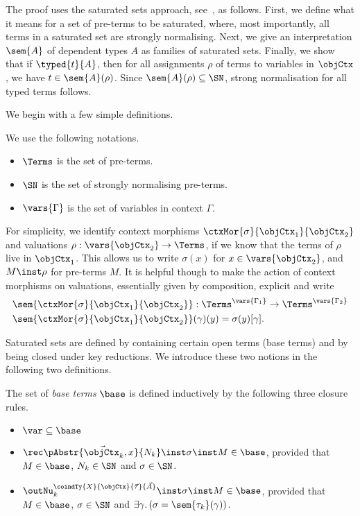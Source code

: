 \documentclass[preprint]{sigplanconf}
\begin{document}
The proof uses the saturated sets approach, see~\cite{Geuvers:SN-CoC-SAT}, as
follows.
First, we define what it means for a set of pre-terms to be saturated, where,
most importantly, all terms in a saturated set are strongly normalising.
Next, we give an interpretation $\sem{A}$ of dependent types $A$ as families of
saturated sets.
Finally, we show that if $\typed{t}{A}$, then for all assignments $\rho$ of
terms to variables in $\objCtx$, we have $t \in \sem{A}(\rho)$.
Since $\sem{A}(\rho) \subseteq \SN$, strong normalisation for all typed terms
follows.

We begin with a few simple definitions.
\begin{definition}
  We use the following notations.
  \begin{itemize}
  \item $\Terms$ is the set of pre-terms.
  \item $\SN$ is the set of strongly normalising pre-terms.
  \item $\vars{\Gamma}$ is the set of variables in context $\Gamma$.
  \end{itemize}
\end{definition}

For simplicity, we identify context morphisms
$\ctxMor{\sigma}{\objCtx_1}{\objCtx_2}$ and valuations
$\rho : \vars{\objCtx_2} \to \Terms$, if we know that the terms of $\rho$ live
in $\objCtx_1$.
This allows us to write $\sigma(x)$ for $x \in \vars{\objCtx_2}$, and
$M \inst \rho$ for pre-terms $M$.
It is helpful though to make the action of context morphisms on
valuations, essentially given by composition, explicit and write
\begin{equation}
  \label{eq:sem-ctx-mor}
  \begin{aligned}
    & \sem{\ctxMor{\sigma}{\objCtx_1}{\objCtx_2}} :
    \Terms^{\vars{\Gamma_1}} \to \Terms^{\vars{\Gamma_2}} \\
    & \sem{\ctxMor{\sigma}{\objCtx_1}{\objCtx_2}}(\gamma)(y)
    = \sigma(y)[\gamma].
  \end{aligned}
\end{equation}

Saturated sets are defined by containing certain open terms (base terms)
and by being closed under key reductions.
We introduce these two notions in the following two definitions.
\begin{definition}
  The set of \emph{base terms} $\base$ is defined inductively by the following
  three closure rules.
  \begin{itemize}
  \item $\var \subseteq \base $
  \item
    $\rec \vec{\pAbstr{\objCtx_k, x}{N_k}} \inst \sigma \inst M \in \base$,
    provided that $M \in \base$, $N_k \in \SN$ and $\sigma \in \SN$.
  \item
    $\outNu_k^{\coindTy{X}{\objCtx}{\vec{\tau}}{\vec{A}}} \inst \sigma \inst M
    \in \base$,
    provided that $M \in \base$, $\sigma \in \SN$ and
    $\exists \gamma. \left(\sigma = \sem{\tau_k}(\gamma) \right)$.
  \end{itemize}
\end{definition}
\end{document}

